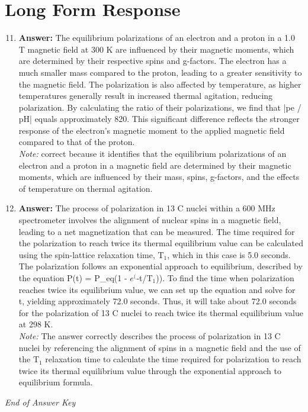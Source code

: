 \documentclass[12pt]{article}
\begin{document}
\section*{Long Form Response}
\begin{enumerate}[label=\arabic*.]
\setcounter{enumi}{10}
\item \textbf{Answer:} The equilibrium polarizations of an electron and a proton in a 1.0 T magnetic field at 300 K are influenced by their magnetic moments, which are determined by their respective spins and g-factors. The electron has a much smaller mass compared to the proton, leading to a greater sensitivity to the magnetic field. The polarization is also affected by temperature, as higher temperatures generally result in increased thermal agitation, reducing polarization. By calculating the ratio of their polarizations, we find that |pe / pH| equals approximately 820. This significant difference reflects the stronger response of the electron's magnetic moment to the applied magnetic field compared to that of the proton.
\\ \textit{Note:} correct because it identifies that the equilibrium polarizations of an electron and a proton in a magnetic field are determined by their magnetic moments, which are influenced by their mass, spins, g-factors, and the effects of temperature on thermal agitation.
\item \textbf{Answer:} The process of polarization in 13 C nuclei within a 600 MHz spectrometer involves the alignment of nuclear spins in a magnetic field, leading to a net magnetization that can be measured. The time required for the polarization to reach twice its thermal equilibrium value can be calculated using the spin-lattice relaxation time, T$_{1}$, which in this case is 5.0 seconds. The polarization follows an exponential approach to equilibrium, described by the equation P(t) = P\_eq(1 - $e^($-t/T$_{1}$)). To find the time when polarization reaches twice its equilibrium value, we can set up the equation and solve for t, yielding approximately 72.0 seconds. Thus, it will take about 72.0 seconds for the polarization of 13 C nuclei to reach twice its thermal equilibrium value at 298 K.
\\ \textit{Note:} The answer correctly describes the process of polarization in 13 C nuclei by referencing the alignment of spins in a magnetic field and the use of the T$_{1}$ relaxation time to calculate the time required for polarization to reach twice its thermal equilibrium value through the exponential approach to equilibrium formula.
\end{enumerate}

\vfill
\noindent\textit{End of Answer Key}
\end{document}
